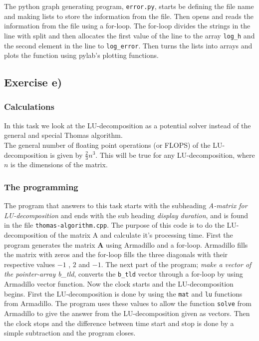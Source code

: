 \documentclass{article}
\begin{document}
    The python graph generating program, \texttt{error.py}, starts be defining the file name and making lists to store the information from the file. Then opens and reads the information from the file using a for-loop. The for-loop divides the strings in the line with split and then allocates the first value of the line to the array \texttt{log\_h} and the second element in the line to \texttt{log\_error}. Then turns the lists into arrays and plots the function using pylab's plotting functions.


\subsection{Exercise e)}


  \subsubsection{Calculations}

    In this task we look at the LU-decomposition as a potential solver instead of the general and special Thomas algorithm. \\

    The general number of floating point operations (or FLOPS) of the LU-decomposition is given by $ \frac{2}{3} n^3$. This will be true for any LU-decomposition, where $n$ is the dimensions of the matrix.


  \subsubsection{The programming}


    The program that answers to this task starts with the subheading \textit{A-matrix for LU-decomposition} and ends with the sub heading \textit{display duration}, and is found in the file \texttt{thomas-algorithm.cpp}. The purpose of this code is to do the LU-decomposition of the matrix A and calculate it's processing time. First the program generates the matrix \textbf{A} using Armadillo and a for-loop. Armadillo fills the matrix with zeros and the for-loop fills the three diagonals with their respective values $-1$ , $2$ and $ -1$. The next part of the program; \textit{make a vector of the pointer-array b\_tld}, converts the \texttt{b\_tld} vector through a for-loop by using Armadillo vector function. Now the clock starts and the LU-decomposition begins. First the LU-decomposition is done by using the \texttt{mat} and \texttt{lu} functions from Armadillo. The program uses these values to allow the function \texttt{solve} from Armadillo to give the answer from the LU-decomposition given as vectors. Then the clock stops and the difference between time start and stop is done by a simple subtraction and the program closes. \\
\end{document}
